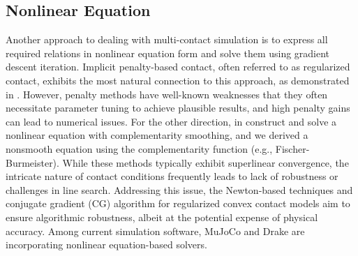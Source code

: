 \documentclass[lettersize,journal]{IEEEtran}
\begin{document}
\subsection{Nonlinear Equation}

Another approach to dealing with multi-contact simulation is to express all required relations in nonlinear equation form and solve them using gradient descent iteration. 
Implicit penalty-based contact, often referred to as regularized contact, exhibits the most natural connection to this approach, as demonstrated in \cite{geilinger2020add,castro2020transition}. 
However, penalty methods have well-known weaknesses that they often necessitate parameter tuning to achieve plausible results, and high penalty gains can lead to numerical issues.
For the other direction, in \cite{howell2022dojo} construct and solve a nonlinear equation with complementarity smoothing, and \cite{macklin2019nonsmooth} we derived a nonsmooth equation using the complementarity function (e.g., Fischer-Burmeister).
While these methods typically exhibit superlinear convergence, the intricate nature of contact conditions frequently leads to lack of robustness or challenges in line search. 
Addressing this issue, the Newton-based techniques \cite{castro2022unconstrained} and conjugate gradient (CG) algorithm for regularized convex contact models aim to ensure algorithmic robustness, albeit at the potential expense of physical accuracy. 
Among current simulation software, MuJoCo and Drake \cite{drake} are incorporating nonlinear equation-based solvers.


\begin{table}[t]
\centering
\caption{Comparison of contact models and solvers used in popular robotic simulators.}
\renewcommand{\arraystretch}{2.0}{
}
\label{table:simulator_compare}
\end{table}
\end{document}
